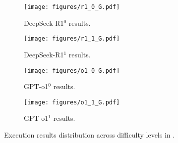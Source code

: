 

\begin{figure}[t!]
    \centering
    \begin{subfigure}[t]{0.23\textwidth}
        \centering
        \texttt{[image: figures/r1\_0\_G.pdf]}
        \caption{DeepSeek-R1$^0$ results.}
    \end{subfigure}
    \hspace{-0.008\textwidth}  %
    \begin{subfigure}[t]{0.23\textwidth}
        \centering
        \texttt{[image: figures/r1\_1\_G.pdf]}
        \caption{DeepSeek-R1$^1$ results.}
    \end{subfigure}
    
    \vspace{0.2cm}  %

    \begin{subfigure}[t]{0.23\textwidth}
        \centering
        \texttt{[image: figures/o1\_0\_G.pdf]}
        \caption{GPT-o1$^0$ results.}
    \end{subfigure}
    \hspace{-0.008\textwidth}  %
    \begin{subfigure}[t]{0.23\textwidth}
        \centering
        \texttt{[image: figures/o1\_1\_G.pdf]}
        \caption{GPT-o1$^1$ results.}
    \end{subfigure}

    \caption{Execution results distribution across difficulty levels in \benchone.}
    \label{fig:barG}
\end{figure}
